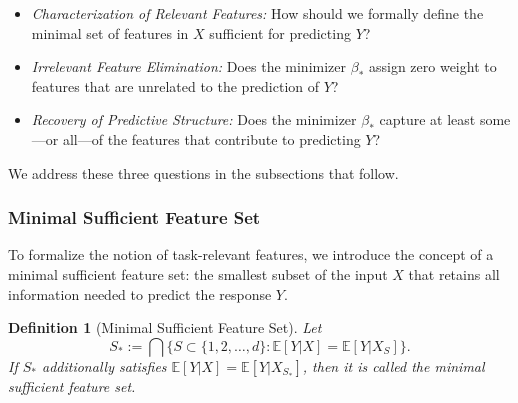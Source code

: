 \documentclass[sn-mathphys-num]{sn-jnl}%
\numberwithin{equation}{section}
\newcommand{\redblock}[1]{{\color{black}#1}}
\newcommand{\E}{\mathbb{E}}
\theoremstyle{thmstyleone}%
\theoremstyle{thmstyletwo}%
\theoremstyle{thmstylethree}%
\newtheorem{definition}{Definition}%
\begin{document}
\begin{itemize}
\item[$\mathsf{(a)}$] \emph{Characterization of Relevant Features:} 
How should we formally define the minimal set of features in $X$ sufficient for predicting $Y$?

\item[$\mathsf{(b)}$] \emph{Irrelevant Feature Elimination:}
Does the minimizer $\beta_*$ assign zero weight to features that are unrelated to the prediction of $Y$?

\item[$\mathsf{(c)}$] \emph{Recovery of Predictive Structure:}
Does the minimizer $\beta_*$ capture at least some---or all---of the features that contribute to predicting $Y$?
\end{itemize}
We address these three questions in the subsections that follow.

%


\redblock{
\subsubsection{Minimal Sufficient Feature Set} 
\label{sec:minimal-sufficient-feature-set}
}
To formalize the notion of task-relevant features, we introduce the concept of a minimal sufficient feature set: the smallest subset of the input $X$ that retains all information needed to predict the response $Y$.

\vspace{0.5em}
\begin{definition}[Minimal Sufficient Feature Set]
\label{definition:minimal-sufficient-feature-set}
Let
\begin{equation}
\label{eqn:core-sufficient-feature-subset}
S_* := \bigcap \{S \subset \{1, 2, \ldots, d\}: \E[Y|X] = \E[Y|X_S] \}.
\end{equation} 
If $S_*$ additionally satisfies $\E[Y|X] = \E[Y|X_{S_*}]$, then it is called the \emph{minimal sufficient feature set}.
\end{definition}
\end{document}
